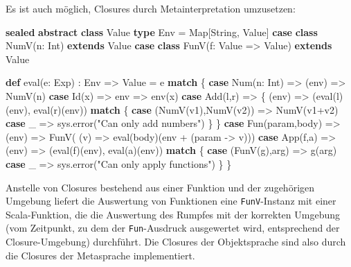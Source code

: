 \documentclass[]{article}
\newenvironment{Shaded}{}{}
\newcommand{\FunctionTok}[1]{\textcolor[rgb]{0.02,0.16,0.49}{#1}}
\newcommand{\KeywordTok}[1]{\textcolor[rgb]{0.00,0.44,0.13}{\textbf{#1}}}
\newcommand{\NormalTok}[1]{#1}
\newcommand{\StringTok}[1]{\textcolor[rgb]{0.25,0.44,0.63}{#1}}
\begin{document}
Es ist auch möglich, Closures durch Metainterpretation umzusetzen:

\begin{Shaded}
\begin{Highlighting}[]
\KeywordTok{sealed} \KeywordTok{abstract} \KeywordTok{class}\NormalTok{ Value}
\KeywordTok{type}\NormalTok{ Env = Map[String, Value]}
\KeywordTok{case} \KeywordTok{class} \FunctionTok{NumV}\NormalTok{(n: Int) }\KeywordTok{extends}\NormalTok{ Value}
\KeywordTok{case} \KeywordTok{class} \FunctionTok{FunV}\NormalTok{(f: Value =\textgreater{} Value) }\KeywordTok{extends}\NormalTok{ Value}

\KeywordTok{def} \FunctionTok{eval}\NormalTok{(e: Exp) : Env =\textgreater{} Value = e }\KeywordTok{match}\NormalTok{ \{}
  \KeywordTok{case} \FunctionTok{Num}\NormalTok{(n: Int) =\textgreater{} (env) =\textgreater{} }\FunctionTok{NumV}\NormalTok{(n)}
  \KeywordTok{case} \FunctionTok{Id}\NormalTok{(x) =\textgreater{} env =\textgreater{} }\FunctionTok{env}\NormalTok{(x)}
  \KeywordTok{case} \FunctionTok{Add}\NormalTok{(l,r) =\textgreater{} \{ (env) =\textgreater{}}
\NormalTok{    (}\FunctionTok{eval}\NormalTok{(l)(env),  }\FunctionTok{eval}\NormalTok{(r)(env)) }\KeywordTok{match}\NormalTok{ \{}
      \KeywordTok{case}\NormalTok{ (}\FunctionTok{NumV}\NormalTok{(v1),}\FunctionTok{NumV}\NormalTok{(v2)) =\textgreater{} }\FunctionTok{NumV}\NormalTok{(v1+v2)}
      \KeywordTok{case}\NormalTok{ \_ =\textgreater{} sys.}\FunctionTok{error}\NormalTok{(}\StringTok{"Can only add numbers"}\NormalTok{)}
\NormalTok{    \}}
\NormalTok{  \}}
  \KeywordTok{case} \FunctionTok{Fun}\NormalTok{(param,body) =\textgreater{} (env) =\textgreater{} }\FunctionTok{FunV}\NormalTok{( (v) =\textgreater{} }\FunctionTok{eval}\NormalTok{(body)(env + (param {-}\textgreater{} v)))}
  \KeywordTok{case} \FunctionTok{App}\NormalTok{(f,a) =\textgreater{} (env) =\textgreater{} (}\FunctionTok{eval}\NormalTok{(f)(env), }\FunctionTok{eval}\NormalTok{(a)(env)) }\KeywordTok{match}\NormalTok{ \{}
    \KeywordTok{case}\NormalTok{ (}\FunctionTok{FunV}\NormalTok{(g),arg) =\textgreater{} }\FunctionTok{g}\NormalTok{(arg)}
    \KeywordTok{case}\NormalTok{ \_ =\textgreater{} sys.}\FunctionTok{error}\NormalTok{(}\StringTok{"Can only apply functions"}\NormalTok{)}
\NormalTok{  \}}
\NormalTok{\}}
\end{Highlighting}
\end{Shaded}

Anstelle von Closures bestehend aus einer Funktion und der zugehörigen
Umgebung liefert die Auswertung von Funktionen eine
\texttt{FunV}-Instanz mit einer Scala-Funktion, die die Auswertung des
Rumpfes mit der korrekten Umgebung (vom Zeitpunkt, zu dem der
\texttt{Fun}-Ausdruck ausgewertet wird, entsprechend der
Closure-Umgebung) durchführt. Die Closures der Objektsprache sind also
durch die Closures der Metasprache implementiert.
\end{document}
